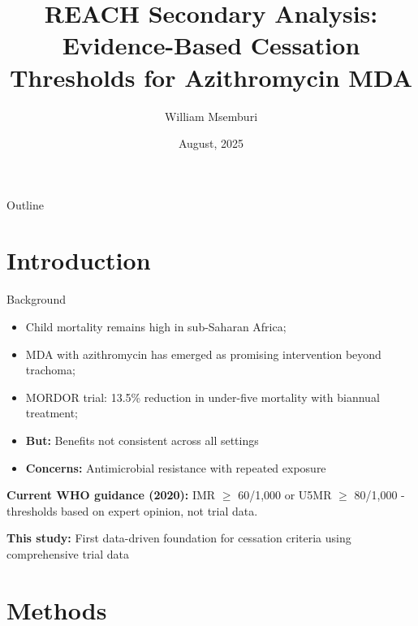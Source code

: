 \documentclass[aspectratio=169]{beamer}\usepackage[]{graphicx}\usepackage[dvipsnames]{xcolor}
\title{REACH Secondary Analysis: Evidence-Based Cessation Thresholds for Azithromycin MDA}
\author{William Msemburi}
\date{August, 2025}
\begin{document}
	

\begin{frame}{Outline}
  \tableofcontents
\end{frame}

\section{Introduction}

\begin{frame}{Background}
\begin{itemize}
  \item Child mortality remains high in sub-Saharan Africa;
  \item MDA with azithromycin has emerged as promising intervention beyond trachoma;
  \item MORDOR trial: 13.5\% reduction in under-five mortality with biannual treatment;
  \item \textbf{But:} Benefits not consistent across all settings
  \item \textbf{Concerns:} Antimicrobial resistance with repeated exposure
\end{itemize}

\vspace{0.3cm}
\textbf{Current WHO guidance (2020):} IMR $\geq$ 60/1,000 or U5MR $\geq$ 80/1,000 - thresholds based on expert opinion, not trial data. 

\vspace{0.3cm}
\textbf{This study:} First data-driven foundation for cessation criteria using comprehensive trial data
\end{frame}



\section{Methods}
\end{document}
